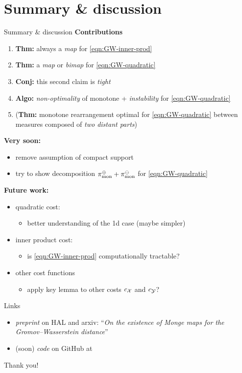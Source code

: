 \documentclass[9pt,xcolor={dvipsnames}]{beamer}
\begin{document}
\section{Summary \& discussion}
\begin{frame}{Summary \& discussion}
    \textbf{Contributions}
    \begin{enumerate}
        \item \textbf{Thm:} always a \emph{map} for \cref{eqn:GW-inner-prod}
        \item \textbf{Thm:} a \emph{map} or \emph{bimap} for \cref{eqn:GW-quadratic}
        \item \textbf{Conj:} this second claim is \emph{tight}
        \item \textbf{Algo:} \emph{non-optimality} of monotone + \emph{instability} for \cref{eqn:GW-quadratic}
        \item (\textbf{Thm:} monotone rearrangement optimal for \cref{eqn:GW-quadratic} between measures composed of \emph{two distant parts})
    \end{enumerate}
\vfill
\textbf{Very soon:}
\begin{itemize}
    \item remove assumption of compact support
    \item try to show decomposition $\pi_\text{mon}^\oplus+\pi_\text{mon}^\ominus$ for \cref{eqn:GW-quadratic}
\end{itemize}
\vfill
\textbf{Future work:}
\begin{itemize}
    \item quadratic cost: \begin{itemize}
        \item better understanding of the 1d case (maybe simpler)
    \end{itemize}
    \item inner product cost: \begin{itemize}
        \item is \cref{eqn:GW-inner-prod} computationally tractable?
    \end{itemize}
    \item other cost functions \begin{itemize}
        \item apply key lemma to other costs $c_{\mathcal{X}}$ and $c_{\mathcal{Y}}$?
    \end{itemize}
\end{itemize}
\end{frame}
\begin{frame}{Links}
    \begin{itemize}
        \item \emph{preprint} on HAL and arxiv: ``\textit{On the existence of Monge maps for the Gromov--Wasserstein distance}'' 
        \item (soon) \emph{code} on GitHub at 
    \end{itemize}
\end{frame}
\begin{frame}[standout]
    Thank you!
\end{frame}
\end{document}
